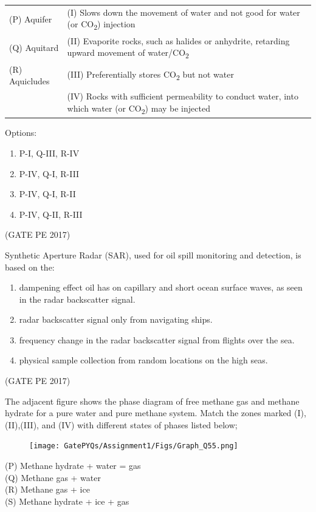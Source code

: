 \documentclass[journal,12pt,onecolumn]{IEEEtran}
\theoremstyle{remark}
\begin{document}
\begin{enumerate}
{\begin{tabular}{ll}
(P) Aquifer     & (I) Slows down the movement of water and
                not good for water (or CO\textsubscript{2}) injection \\
(Q) Aquitard    & (II) Evaporite rocks, such as halides or 
                 anhydrite, retarding upward movement
                 of water/CO\textsubscript{2} \\
(R) Aquicludes  & (III) Preferentially stores CO\textsubscript{2}                      but not water \\
                & (IV) Rocks with sufficient permeability to conduct water, into which water (or CO\textsubscript{2}) may be injected \\
\end{tabular}

Options:
\begin{enumerate}
\item P-I, Q-III, R-IV  
\item P-IV, Q-I, R-III  
\item P-IV, Q-I, R-II  
\item P-IV, Q-II, R-III  
\end{enumerate}
\hfill{(GATE PE 2017)}

\item Synthetic Aperture Radar (SAR), used for oil spill monitoring and detection, is based on the:\\
\begin{enumerate}
\item dampening effect oil has on capillary and short ocean surface waves, as seen in the radar backscatter signal.
\item radar backscatter signal only from navigating ships.
\item frequency change in the radar backscatter signal from flights over the sea.
\item physical sample collection from random locations on the high seas.
\end{enumerate}
\hfill{(GATE PE 2017)}

\item The adjacent figure shows the phase diagram of free methane gas and methane hydrate for a pure water and pure methane system. Match the zones marked (I),(II),(III), and (IV) with different states of phases listed below;

\begin{figure}[h]
    \centering
    \texttt{[image: GatePYQs/Assignment1/Figs/Graph\_Q55.png]}
\end{figure}
(P) Methane hydrate + water = gas\\
(Q) Methane gas + water\\
(R) Methane gas + ice\\
(S) Methane hydrate + ice + gas\\

}
\end{enumerate}
\end{document}

